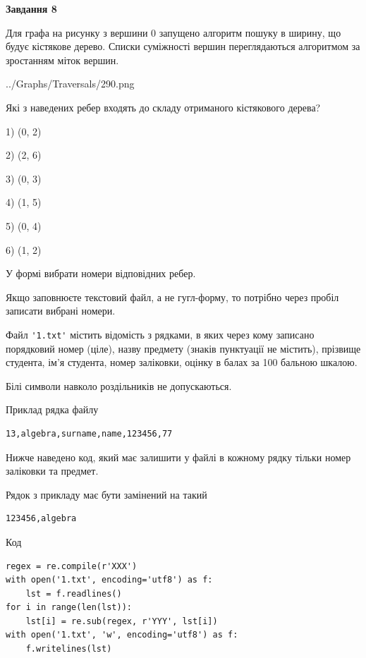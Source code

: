 \documentclass[12pt, ukrainian]{article}
\def\code#1{\Verb!#1!}
\begin{document}
{\begin {large}
{\begin {center}\textbf{Завдання 8}\end {center}}\par
Для графа на рисунку з вершини 0 запущено алгоритм пошуку в ширину, що будує кістякове дерево. Списки суміжності вершин переглядаються алгоритмом за зростанням міток вершин.\par
\begin{center}
	{../Graphs/Traversals/290.png}
\end{center}
\par Які з наведених ребер входять до складу отриманого кістякового дерева?\par
1) (0, 2)\par
2) (2, 6)\par
3) (0, 3)\par
4) (1, 5)\par
5) (0, 4)\par
6) (1, 2)\par
{\vskip 15pt} У формі вибрати номери відповідних ребер.


Якщо заповнюєте текстовий файл, а не гугл-форму, то потрібно через пробіл записа\-ти вибрані номери.\par
\newpage


Файл \code{'1.txt'} містить відомість з рядками, в яких через кому записано поряд\-ковий номер (ціле), назву предмету (знаків пунктуації не містить), прізвище студента, ім'я студента, номер заліковки, оцінку в балах за 100 бальною шкалою.

Білі символи навколо роздільників не допускаються.

Приклад рядка файлу



\begin{verbatim}
13,algebra,surname,name,123456,77
\end{verbatim}


Нижче наведено код, який має залишити у файлі в кожному рядку тільки номер заліковки та предмет.

Рядок з прикладу має бути замінений на такий



\begin{verbatim}
123456,algebra
\end{verbatim}




Код



\begin{verbatim}
regex = re.compile(r'XXX')
with open('1.txt', encoding='utf8') as f:
    lst = f.readlines()
for i in range(len(lst)):
    lst[i] = re.sub(regex, r'YYY', lst[i])
with open('1.txt', 'w', encoding='utf8') as f:
    f.writelines(lst)
\end{verbatim}







\end{large}}
\end{document}
